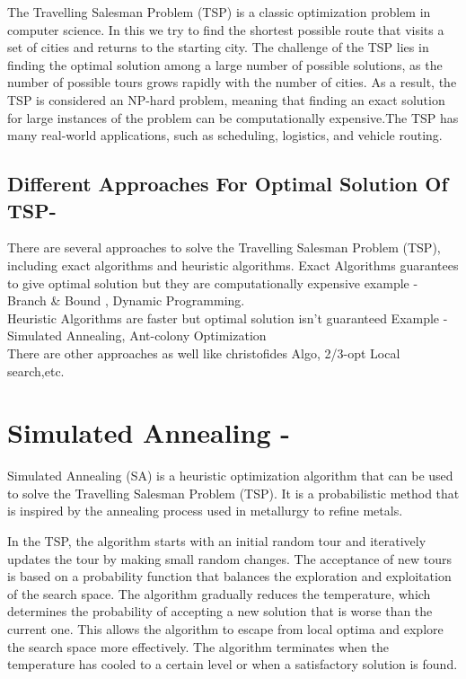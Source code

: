 \documentclass[10pt,journal,compsoc]{IEEEtran}
\begin{document}
\IEEEPARstart{}
The Travelling Salesman Problem (TSP) is a classic optimization problem in computer science. In this we try to find the shortest possible route that visits a set of cities and returns to the starting city.  The challenge of the TSP lies in finding the optimal solution among a large number of possible solutions, as the number of possible tours grows rapidly with the number of cities. As a result, the TSP is considered an NP-hard problem, meaning that finding an exact solution for large instances of the problem can be computationally expensive.The TSP has many real-world applications, such as scheduling, logistics, and vehicle routing.


\subsection{Different Approaches For Optimal Solution Of TSP- }
There are several approaches to solve the Travelling Salesman Problem (TSP), including exact algorithms and heuristic algorithms.
Exact Algorithms guarantees to give optimal solution but they are computationally expensive example - Branch \& Bound , Dynamic Programming.\\
Heuristic Algorithms are faster but optimal solution isn't guaranteed Example - Simulated Annealing, Ant-colony Optimization\\
There are other approaches as well like christofides Algo, 2/3-opt Local search,etc.

\section*{Simulated Annealing - }
Simulated Annealing (SA) is a heuristic optimization algorithm that can be used to solve the Travelling Salesman Problem (TSP). It is a probabilistic method that is inspired by the annealing process used in metallurgy to refine metals.

In the TSP, the algorithm starts with an initial random tour and iteratively updates the tour by making small random changes. The acceptance of new tours is based on a probability function that balances the exploration and exploitation of the search space. The algorithm gradually reduces the temperature, which determines the probability of accepting a new solution that is worse than the current one. This allows the algorithm to escape from local optima and explore the search space more effectively. The algorithm terminates when the temperature has cooled to a certain level or when a satisfactory solution is found.
\end{document}
